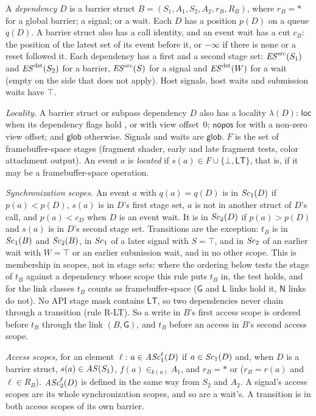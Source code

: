 \begin{definition}\label{def:spec}
A \emph{dependency} $D$ is a barrier struct $B=(S_1,A_1,S_2,A_2,r_B,R_B)$, where $r_B = \ast$ for a global
barrier; a signal; or a wait. Each $D$ has a position $p(D)$ on a queue $q(D)$. A barrier struct also has a call
identity, and an event wait has a cut $c_B$: the position of the latest set of its event before it, or $-\infty$ if
there is none or a reset followed it. Each dependency has a first and a second stage set: $\mathit{ES}^{\mathrm{src}}(S_1)$ and $\mathit{ES}^{\mathrm{dst}}(S_2)$
for a barrier, $\mathit{ES}^{\mathrm{src}}(S)$ for a signal and $\mathit{ES}^{\mathrm{dst}}(W)$ for a wait (empty on the side that does not apply). Host signals,
host waits and submission waits have $\top$.

\emph{Locality.} A barrier struct or subpass dependency $D$ also has a locality $\lambda(D)$: $\mathsf{loc}$ when its
dependency flags hold , or  with view offset~0; $\mathsf{nopos}$ for
 with a non-zero view offset; and $\mathsf{glob}$ otherwise. Signals and waits are $\mathsf{glob}$.
$F$ is the set of framebuffer-space stages (fragment shader, early and late fragment tests, color attachment output).
An event $a$ is \emph{located} if $s(a) \in F \cup \{\bot, \mathsf{LT}\}$, that is, if it may be a framebuffer-space
operation.

\emph{Synchronization scopes.} An event $a$ with $q(a) = q(D)$ is in $\mathit{Sc}_{1}(D)$ if $p(a) < p(D)$, $s(a)$ is in
$D$'s first stage set, $a$ is not in another struct of $D$'s call, and $p(a) < c_D$ when $D$ is an event wait. It
is in $\mathit{Sc}_{2}(D)$ if $p(a) > p(D)$ and $s(a)$ is in $D$'s second stage set. Transitions are the exception: $t_B$ is
in $\mathit{Sc}_{1}(B)$ and $\mathit{Sc}_{2}(B)$, in $\mathit{Sc}_{1}$ of a later signal with $S = \top$, and in $\mathit{Sc}_{2}$ of an earlier wait
with $W = \top$ or an earlier submission wait, and in no other scope. This is membership in scopes, not in stage
sets: where the ordering below tests the stage of $t_B$ against a dependency whose scope this rule puts $t_B$ in,
the test holds, and for the link classes $t_B$ counts as framebuffer-space ($\mathsf{G}$ and $\mathsf{L}$ links
hold it, $\mathsf{N}$ links do not). No API stage mask contains $\mathsf{LT}$, so two dependencies never chain
through a transition (rule R-LT). So a write in $B$'s first access scope is ordered before $t_B$ through the link
$(B,\mathsf{G})$, and $t_B$ before an access in $B$'s second access scope.

\emph{Access scopes,} for an element $\ell$: $a \in \mathit{ASc}_{1}^{\ell}(D)$ if $a \in \mathit{Sc}_{1}(D)$ and, when $D$ is a barrier
struct, $s(a) \in \mathit{AS}(S_1)$, $f(a) \in_{k(a)} A_1$, and $r_B = \ast$ or ($r_B = r(a)$ and $\ell \in R_B$).
$\mathit{ASc}_{2}^{\ell}(D)$ is defined in the same way from $S_2$ and $A_2$. A signal's access scopes are its whole
synchronization scopes, and so are a wait's. A transition is in both access scopes of its own barrier.


\end{definition}

